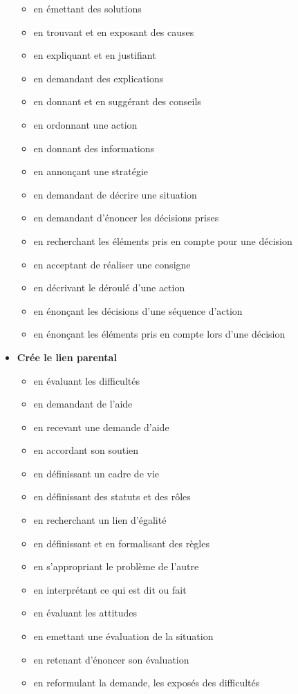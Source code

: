 \documentclass[8pt,a4paper]{article}
\begin{document}
\begin{itemize}
\begin{itemize}
\item en émettant des solutions
\item en trouvant et en exposant des causes  
\item en expliquant et en justifiant
\item en demandant des explications
\item en donnant et en suggérant des conseils  
\item en ordonnant une action
\item en donnant des informations
\item en annonçant une stratégie  
\item en demandant de décrire une situation  
\item en demandant d'énoncer les décisions prises  
\item en recherchant les éléments pris en compte pour une décision
\item en acceptant de réaliser une consigne
\item en décrivant le déroulé d'une action
\item en énonçant les décisions d'une séquence d'action
\item en énonçant les éléments pris en compte lors d'une décision 
\\ 
 \end{itemize}
\item \textbf{Crée le lien parental }
\begin{itemize}
\item en évaluant les difficultés
\item en demandant de l'aide
\item en recevant une demande d'aide
\item en accordant son soutien
\item en définissant un cadre de vie
\item en définissant des statuts et des rôles
\item en recherchant un lien d'égalité
\item en définissant et en formalisant des règles
\item en s'appropriant le problème de l'autre
\item en interprétant ce qui est dit ou fait
\item en évaluant les attitudes  
\item en emettant une évaluation de la situation  
\item en retenant d'énoncer son évaluation  
\item en reformulant la demande, les exposés des difficultés

\end{itemize}
\end{itemize}
\end{document}
